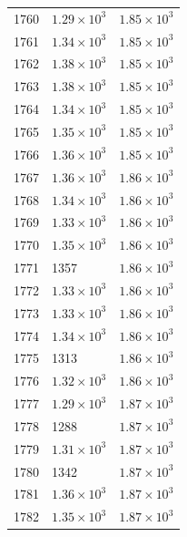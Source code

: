 \begin{table}[H]
\begin{tabular}{lll}
1760 & $\displaystyle 1.29 \times 10^{3}$ & $\displaystyle 1.85 \times 10^{3}$ \\
1761 & $\displaystyle 1.34 \times 10^{3}$ & $\displaystyle 1.85 \times 10^{3}$ \\
1762 & $\displaystyle 1.38 \times 10^{3}$ & $\displaystyle 1.85 \times 10^{3}$ \\
1763 & $\displaystyle 1.38 \times 10^{3}$ & $\displaystyle 1.85 \times 10^{3}$ \\
1764 & $\displaystyle 1.34 \times 10^{3}$ & $\displaystyle 1.85 \times 10^{3}$ \\
1765 & $\displaystyle 1.35 \times 10^{3}$ & $\displaystyle 1.85 \times 10^{3}$ \\
1766 & $\displaystyle 1.36 \times 10^{3}$ & $\displaystyle 1.85 \times 10^{3}$ \\
1767 & $\displaystyle 1.36 \times 10^{3}$ & $\displaystyle 1.86 \times 10^{3}$ \\
1768 & $\displaystyle 1.34 \times 10^{3}$ & $\displaystyle 1.86 \times 10^{3}$ \\
1769 & $\displaystyle 1.33 \times 10^{3}$ & $\displaystyle 1.86 \times 10^{3}$ \\
1770 & $\displaystyle 1.35 \times 10^{3}$ & $\displaystyle 1.86 \times 10^{3}$ \\
1771 & 1357 & $\displaystyle 1.86 \times 10^{3}$ \\
1772 & $\displaystyle 1.33 \times 10^{3}$ & $\displaystyle 1.86 \times 10^{3}$ \\
1773 & $\displaystyle 1.33 \times 10^{3}$ & $\displaystyle 1.86 \times 10^{3}$ \\
1774 & $\displaystyle 1.34 \times 10^{3}$ & $\displaystyle 1.86 \times 10^{3}$ \\
1775 & 1313 & $\displaystyle 1.86 \times 10^{3}$ \\
1776 & $\displaystyle 1.32 \times 10^{3}$ & $\displaystyle 1.86 \times 10^{3}$ \\
1777 & $\displaystyle 1.29 \times 10^{3}$ & $\displaystyle 1.87 \times 10^{3}$ \\
1778 & 1288 & $\displaystyle 1.87 \times 10^{3}$ \\
1779 & $\displaystyle 1.31 \times 10^{3}$ & $\displaystyle 1.87 \times 10^{3}$ \\
1780 & 1342 & $\displaystyle 1.87 \times 10^{3}$ \\
1781 & $\displaystyle 1.36 \times 10^{3}$ & $\displaystyle 1.87 \times 10^{3}$ \\
1782 & $\displaystyle 1.35 \times 10^{3}$ & $\displaystyle 1.87 \times 10^{3}$ \\

\end{tabular}
\end{table}
